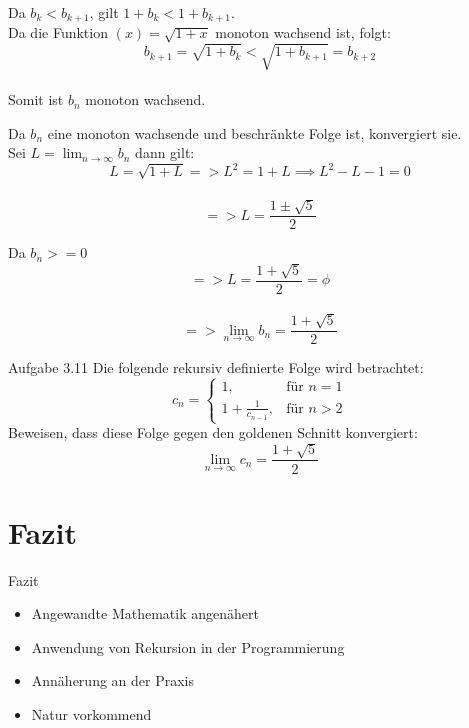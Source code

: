 \documentclass{beamer}
\begin{document}
\begin{frame}
    Da $ b_k < b_{k+1} $, gilt $ 1 + b_k < 1 + b_{k+1} .$  \\
    Da die Funktion $(x) = \sqrt{1 + x}$ monoton wachsend ist, folgt:  \\
$$
b_{k+1} = \sqrt{1 + b_k} < \sqrt{1 + b_{k+1}} = b_{k+2}
$$ \\
    Somit ist $ b_n $ monoton wachsend.
\end{frame}

\begin{frame}
Da $b_n$ eine monoton wachsende und beschränkte Folge ist, konvergiert sie.  \\

Sei $L = \lim_{n \to \infty} b_n $ dann gilt: \\
$$
L = \sqrt{1 + L} => L^2 = 1 + L \implies L^2 - L - 1 = 0 
$$ \\
$$
=> L = \frac{1 \pm \sqrt{5}}{2}
$$

\end{frame}

\begin{frame}
Da $ b_n >= 0$ %
   $$
=> L = \frac{1 + \sqrt{5}}{2} = \phi 
$$  \\
$$
=> \lim_{n \to \infty} b_n = \frac{1 + \sqrt{5}}{2}
$$

\end{frame}

\begin{frame}{Aufgabe 3.11}
    Die folgende rekursiv definierte Folge wird betrachtet:
    \[
    c_n = 
    \begin{cases}
        1, & \text{für } n = 1 \\
        1 + \frac{1}{c_{n-1}}, & \text{für } n > 2
    \end{cases}
    \]
    \bigskip
    Beweisen, dass diese Folge gegen den goldenen Schnitt konvergiert:
    \[
    \lim_{n \to \infty} c_n = \frac{1 + \sqrt{5}}{2}
    \]
\end{frame}


\section{Fazit}
\begin{frame}{Fazit}
        \begin{itemize}
           \item Angewandte Mathematik angenähert 
           \item Anwendung von Rekursion in der Programmierung %
           \item Annäherung an der Praxis 
           \item Natur vorkommend 
        \end{itemize}

\end{frame}
\end{document}
